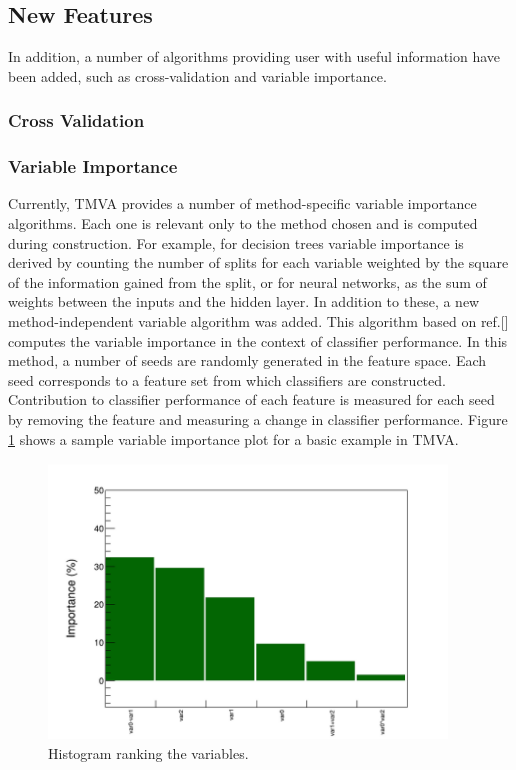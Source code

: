 \documentclass[a4paper]{jpconf}
\begin{document}
\subsection{New Features}
In addition, a number of algorithms providing user with useful information have been added, such as cross-validation and variable importance. 

\subsubsection{Cross Validation} 

\subsubsection{Variable Importance}
Currently, TMVA provides a number of method-specific variable importance algorithms. Each one is relevant only to the method chosen and is computed during construction. For example, for decision trees variable importance is derived by counting the number of splits for each variable weighted by the square of the information gained from the split,   or for neural networks, as the sum of weights between the inputs and the hidden layer. In addition to these, a new method-independent variable algorithm was added. This algorithm based on ref.[] computes the variable importance in the context of classifier performance. In this method, a number of seeds are randomly generated in the feature space. Each seed corresponds to a feature set from which classifiers are constructed. Contribution to classifier performance of each feature is measured for each seed by removing the feature and measuring a change in classifier performance. Figure \ref{vi} shows a sample variable importance plot for a basic example in TMVA.

\begin{figure}[h]
\centering
\includegraphics[width=25pc]{img/vi.png}\caption{\label{vi} Histogram ranking the variables.}
\end{figure}
\end{document}
